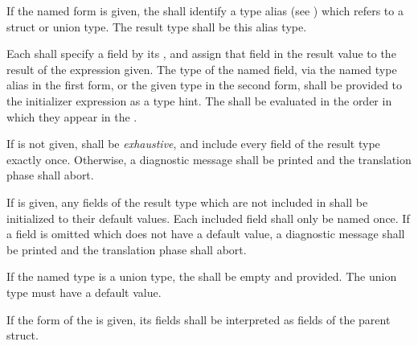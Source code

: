\specsubsubitem
If the named form is given, the  shall identify a type
alias (see ) which refers to a struct or union type.
The result type shall be this alias type.

\specsubsubitem
Each  shall specify a field by its ,
and assign that field in the result value to the result of the expression
given. The type of the named field, via the named type alias in the first form,
or the given type in the second form, shall be provided to the initializer
expression as a type hint. The  shall be evaluated in
the order in which they appear in the .

\specsubsubitem
If  is not given,  shall be
\textit{exhaustive}, and include every field of the result type exactly once.
Otherwise, a diagnostic message shall be printed and the translation phase
shall abort.

\specsubsubitem
If  is given, any fields of the result type which are not
included in  shall be initialized to their default
values. Each included field shall only be named once. If a field is omitted
which does not have a default value, a diagnostic message shall be printed and
the translation phase shall abort.

\specsubsubitem
If the named type is a union type, the  shall be
empty and  provided. The union type must have a default value.

\specsubsubitem
If the  form of the  is
given, its fields shall be interpreted as fields of the parent struct.



